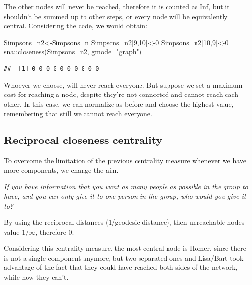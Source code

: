 \documentclass[
  notitlepage,
  onecolumn,
  openany]{book}
\newenvironment{Shaded}{\begin{snugshade}}{\end{snugshade}}
\newcommand{\AttributeTok}[1]{\textcolor[rgb]{0.77,0.63,0.00}{#1}}
\newcommand{\DecValTok}[1]{\textcolor[rgb]{0.00,0.00,0.81}{#1}}
\newcommand{\FunctionTok}[1]{\textcolor[rgb]{0.00,0.00,0.00}{#1}}
\newcommand{\NormalTok}[1]{#1}
\newcommand{\OtherTok}[1]{\textcolor[rgb]{0.56,0.35,0.01}{#1}}
\newcommand{\SpecialCharTok}[1]{\textcolor[rgb]{0.00,0.00,0.00}{#1}}
\newcommand{\StringTok}[1]{\textcolor[rgb]{0.31,0.60,0.02}{#1}}
\begin{document}
The other nodes will never be reached, therefore it is counted as Inf, but it shouldn't be summed up to other steps, or every node will be equivalently central. Considering the code, we would obtain:

\begin{Shaded}
\begin{Highlighting}[]
\NormalTok{Simpsons\_n2}\OtherTok{\textless{}{-}}\NormalTok{Simpsons\_n}
\NormalTok{Simpsons\_n2[}\DecValTok{9}\NormalTok{,}\DecValTok{10}\NormalTok{]}\OtherTok{\textless{}{-}}\DecValTok{0}
\NormalTok{Simpsons\_n2[}\DecValTok{10}\NormalTok{,}\DecValTok{9}\NormalTok{]}\OtherTok{\textless{}{-}}\DecValTok{0}
\NormalTok{sna}\SpecialCharTok{::}\FunctionTok{closeness}\NormalTok{(Simpsons\_n2, }\AttributeTok{gmode=}\StringTok{"graph"}\NormalTok{)}
\end{Highlighting}
\end{Shaded}

\begin{verbatim}
##  [1] 0 0 0 0 0 0 0 0 0 0
\end{verbatim}

Whoever we choose, will never reach everyone. But suppose we set a maximum cost for reaching a node, despite they're not connected and cannot reach each other. In this case, we can normalize as before and choose the highest value, remembering that still we cannot reach everyone.

\hypertarget{reciprocal-closeness-centrality}{%
\subsection{Reciprocal closeness centrality}\label{reciprocal-closeness-centrality}}

To overcome the limitation of the previous centrality measure whenever we have more components, we change the aim.

\emph{If you have information that you want as many people as possible in the group to have, and you can only give it to one person in the group, who would you give it to?}

By using the reciprocal distances (1/geodesic distance), then unreachable nodes value \(1/\infty\), therefore 0.

Considering this centrality measure, the most central node is Homer, since there is not a single component anymore, but two separated ones and Lisa/Bart took advantage of the fact that they could have reached both sides of the network, while now they can't.
\end{document}

